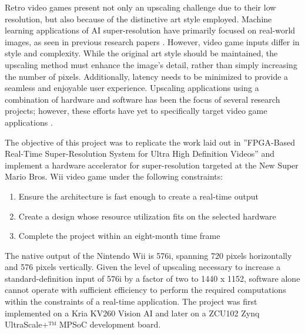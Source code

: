 \documentclass{article}
\begin{document}
\par Retro video games present not only an upscaling challenge due to their low resolution, but also because of the distinctive art style employed. Machine learning applications of AI super-resolution have primarily focused on real-world images, as seen in previous research papers \cite{fsrcnn_dong_accelerating_2016}\cite{srcnn_dong_2015}\cite{he_fpga_based_2018}. However, video game inputs differ in style and complexity. While the original art style should be maintained, the upscaling method must enhance the image's detail, rather than simply increasing the number of pixels. Additionally, latency needs to be minimized to provide a seamless and enjoyable user experience. Upscaling applications using a combination of hardware and software has been the focus of several research projects; however, these efforts have yet to specifically target video game applications \cite{fsrcnn_dong_accelerating_2016}\cite{srcnn_dong_2015}\cite{he_fpga_based_2018}.
\par The objective of this project was to replicate the work laid out in ”FPGA-Based Real-Time Super-Resolution System for Ultra High Definition Videos” \cite{he_fpga_based_2018} and implement a hardware accelerator for super-resolution targeted at the New Super Mario Bros. Wii video game under the following constraints:
\begin{enumerate}
    \item Ensure the architecture is fast enough to create a real-time output
    \item Create a design whose resource utilization fits on the selected hardware 
    \item Complete the project within an eight-month time frame
\end{enumerate}
\par The native output of the Nintendo Wii is 576i, spanning 720 pixels horizontally and 576 pixels vertically. Given the level of upscaling necessary to increase a standard-definition input of 576i by a factor of two to 1440 x 1152, software alone cannot operate with sufficient efficiency to perform the required computations within the constraints of a real-time application. The project was first implemented on a Kria KV260 Vision AI and later on a ZCU102 Zynq UltraScale+™ MPSoC development board. 
\end{document}
